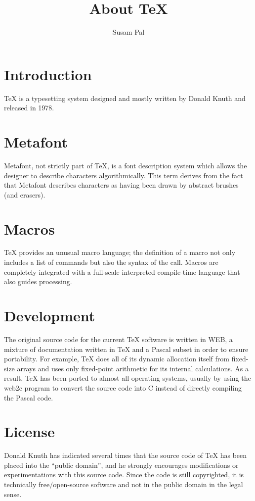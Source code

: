 \documentclass[onecolumn]{article}
\author{Susam Pal}
\title{About \TeX}
\begin{document}
\maketitle
\tableofcontents
\section{Introduction}
\TeX{} is a typesetting system designed and mostly written by Donald
Knuth and released in 1978.

\section{Metafont}
Metafont, not strictly part of \TeX{}, is a font description system
which allows the designer to describe characters algorithmically. This
term derives from the fact that Metafont describes characters as having
been drawn by abstract brushes (and erasers).

\section{Macros}
\TeX{} provides an unusual macro language; the definition of a macro not
only includes a list of commands but also the syntax of the call. Macros
are completely integrated with a full-scale interpreted compile-time
language that also guides processing.

\section{Development}
The original source code for the current \TeX{} software is written in
WEB, a mixture of documentation written in \TeX{} and a Pascal subset in
order to ensure portability. For example, \TeX{} does all of its dynamic
allocation itself from fixed-size arrays and uses only fixed-point
arithmetic for its internal calculations. As a result, \TeX{} has been
ported to almost all operating systems, usually by using the web2c
program to convert the source code into C instead of directly compiling
the Pascal code.

\section{License}
Donald Knuth has indicated several times that the source code of TeX has
been placed into the ``public domain'', and he strongly encourages
modifications or experimentations with this source code. Since the code
is still copyrighted, it is technically free/open-source software and
not in the public domain in the legal sense.
\end{document}
